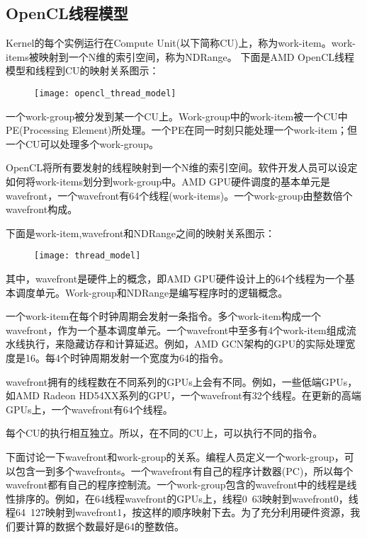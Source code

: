 \subsection{OpenCL线程模型}
Kernel的每个实例运行在Compute Unit(以下简称CU)上，称为work-item。work-items被映射到一个N维的索引空间，称为NDRange。
下面是AMD OpenCL线程模型和线程到CU的映射关系图示：
\begin{figure}[htbp]
	\centering
	\texttt{[image: opencl\_thread\_model]}
	\label{fig:opencl_thread_model}
\end{figure}

一个work-group被分发到某一个CU上。Work-group中的work-item被一个CU中PE(Processing Element)所处理。一个PE在同一时刻只能处理一个work-item；但一个CU可以处理多个work-group。

OpenCL将所有要发射的线程映射到一个N维的索引空间。软件开发人员可以设定如何将work-items划分到work-group中。AMD GPU硬件调度的基本单元是wavefront，一个wavefront有64个线程(work-items)。一个work-group由整数倍个wavefront构成。

下面是work-item,wavefront和NDRange之间的映射关系图示：
\begin{figure}[htbp]
	\centering
	\texttt{[image: thread\_model]}
	\label{fig:thread_model}
\end{figure}

其中，wavefront是硬件上的概念，即AMD GPU硬件设计上的64个线程为一个基本调度单元。Work-group和NDRange是编写程序时的逻辑概念。

一个work-item在每个时钟周期会发射一条指令。多个work-item构成一个wavefront，作为一个基本调度单元。一个wavefront中至多有4个work-item组成流水线执行，来隐藏访存和计算延迟。例如，AMD GCN架构的GPU的实际处理宽度是16。每4个时钟周期发射一个宽度为64的指令。

wavefront拥有的线程数在不同系列的GPUs上会有不同。例如，一些低端GPUs，如AMD Radeon HD54XX系列的GPU，一个wavefront有32个线程。在更新的高端GPUs上，一个wavefront有64个线程。

每个CU的执行相互独立。所以，在不同的CU上，可以执行不同的指令。

下面讨论一下wavefront和work-group的关系。编程人员定义一个work-group，可以包含一到多个wavefronts。一个wavefront有自己的程序计数器(PC)，所以每个wavefront都有自己的程序控制流。一个work-group包含的wavefront中的线程是线性排序的。例如，在64线程wavefront的GPUs上，线程0~63映射到wavefront0，线程64~127映射到wavefront1，按这样的顺序映射下去。为了充分利用硬件资源，我们要计算的数据个数最好是64的整数倍。

